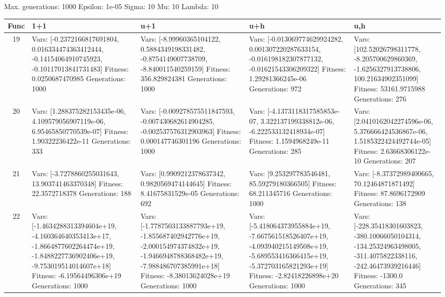 \documentclass[landscape,11pt]{article}
\begin{document}
\newpage
Max. generations: 1000 Epsilon: 1e-05 Sigma: 10 Mu: 10 Lambda: 10 \\
\begin{tabular}{|c|p{5.4cm}|p{5.4cm}|p{5.4cm}|p{5.4cm}|}
\hline
Func & 1+1 & u+1 & u+h & u,h \\ 
\hline 19 & Vars: [-0.2372166817691804, 0.016334474363412444, -0.14154064910745923, -0.10117013841731483] Fitness: 0.0250687470985 Generations: 1000 & Vars: [-8.99960365104122, 0.5884349198331482, -0.8754149007738709, -8.840011540259159] Fitness: 356.829824381 Generations: 1000 & Vars: [-0.013069774629924282, 0.001307220287633154, -0.016198182307877132, -0.01621543306209322] Fitness: 1.29281366245e-06 Generations: 972 & Vars: [102.52026798311778, -8.205700629860369, -1.6256327913738806, 100.21634902351099] Fitness: 53161.9715988 Generations: 276 \\
 \hline 
 20 & Vars: [1.288375282153435e-06, 4.109579056907119e-06, 6.95465850770539e-07] Fitness: 1.90322236422e-11 Generations: 333 & Vars: [-0.009278575511847593, -0.007430682614904285, -0.002537576312903963] Fitness: 0.000147746301196 Generations: 1000 & Vars: [-4.1373118317585853e-07, 3.322137199338812e-06, -6.222533132418934e-07] Fitness: 1.1594968249e-11 Generations: 285 & Vars: [2.0410162042274596e-06, 5.376666424536867e-06, 1.5185322424492744e-05] Fitness: 2.63668306122e-10 Generations: 207 \\
 \hline 
 21 & Vars: [-3.7278860255031643, 13.903741463370348] Fitness: 22.3572718378 Generations: 188 & Vars: [0.9909212378637342, 0.9820569474144645] Fitness: 8.41675831529e-05 Generations: 692 & Vars: [9.253297783546481, 85.59279180366505] Fitness: 68.211345716 Generations: 1000 & Vars: [-8.37372989400665, 70.12464871871492] Fitness: 87.8696172909 Generations: 138 \\
 \hline 
 22 & Vars: [-1.4634288313394604e+19, -4.160364640353413e+17, -1.8664877602264474e+19, -1.8488227736902406e+19, -9.753019514014607e+18] Fitness: -6.19564496306e+19 Generations: 1000 & Vars: [-1.7787503133887793e+19, -1.855687402942776e+19, -2.000154974374832e+19, -1.9466948788368482e+19, -7.988486707385991e+18] Fitness: -8.38013624028e+19 Generations: 1000 & Vars: [-5.418064373955884e+19, -7.667561518526407e+19, -4.093940215149508e+19, -5.689553416366415e+19, -5.372703165821293e+19] Fitness: -2.82418226898e+20 Generations: 1000 & Vars: [-228.35418301603823, -380.10066050104314, -134.25324963498005, -311.4075822338116, -242.46473939216446] Fitness: -1300.0 Generations: 345 \\
 \hline 
\end{tabular}
\end{document}
